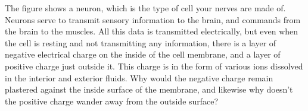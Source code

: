 The figure shows a neuron, which is the type of cell your
        nerves are made of.  Neurons serve to transmit sensory
        information to the brain, and commands from the brain to the
        muscles.  All this data is transmitted electrically, but
        even when the cell is resting and not transmitting any
        information, there is a layer of negative electrical charge
        on the inside of the cell membrane, and a layer of positive
        charge just outside it.  This charge is in the form of
        various ions dissolved in the interior and exterior fluids. 
        Why would the negative charge remain plastered against the
        inside surface of the membrane, and likewise why doesn't the
        positive charge wander away from the outside surface?
